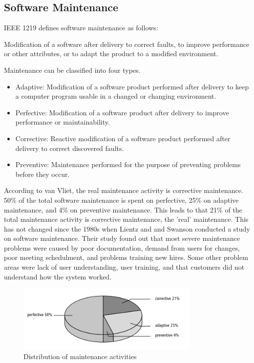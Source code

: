 \subsection{Software Maintenance}
IEEE 1219 defines software maintenance as follows\cite{720567}:
\begin{displayquote}
Modification of a software after delivery to correct faults, to improve performance or other attributes, or to adapt the product to a modified environment.
\end{displayquote} 
Maintenance can be classified into four types\cite{Bennett:2000:SME:336512.336534,720567}.

\begin{itemize}
	\item Adaptive: Modification of a software product performed after delivery to keep a computer program usable in a changed or changing environment.
	\item Perfective: Modification of a software product after delivery to improve performance or maintainability.
	\item Corrective: Reactive modification of a software product performed after delivery to correct discovered faults.
	\item Preventive: Maintenance performed for the purpose of preventing problems before they occur.
\end{itemize}

According to van Vliet, the real maintenance activity is corrective maintenance\cite{Vliet:2008:SEP:1481475}. 50\% of the total software maintenance is spent on perfective, 25\% on adaptive maintenance, and 4\% on preventive maintenance. This leads to that 21\% of the total maintenance activity is corrective maintenance, the 'real' maintenance\cite{Vliet:2008:SEP:1481475}. This has not changed since the 1980s when Lientz and and Swanson conducted a study on software maintenance\cite{lientz1980software}. Their study found out that most severe maintenance problems were caused by poor documentation, demand from users for changes, poor meeting schedulment, and problems training new hires. Some other problem areas were lack of user understanding, user training, and that customers did not understand how the system worked.

\begin{figure}
	\centering
	\includegraphics[width=0.8\textwidth]{images/maintenance.png}
	\caption{Distribution of maintenance activities\cite{Vliet:2008:SEP:1481475}}
	\label{fig:maintenanceActivities}
\end{figure}



